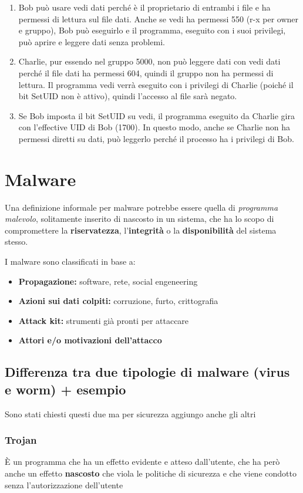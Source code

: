 \documentclass{report}
\begin{document}
\begin{enumerate}
    \item Bob può usare vedi dati perché è il proprietario di entrambi i file e ha permessi di lettura sul file dati. Anche se vedi ha permessi 550 (r-x per owner e gruppo), Bob può eseguirlo e il programma, eseguito con i suoi privilegi, può aprire e leggere dati senza problemi.
    \item Charlie, pur essendo nel gruppo 5000, non può leggere dati con vedi dati perché il file dati ha permessi 604, quindi il gruppo non ha permessi di lettura. Il programma vedi verrà eseguito con i privilegi di Charlie (poiché il bit SetUID non è attivo), quindi l’accesso al file sarà negato.
    \item Se Bob imposta il bit SetUID su vedi, il programma eseguito da Charlie gira con l’effective UID di Bob (1700). In questo modo, anche se Charlie non ha permessi diretti su dati, può leggerlo perché il processo ha i privilegi di Bob. 
\end{enumerate}



\chapter{Malware}
\noindent Una definizione informale per malware potrebbe essere quella di \textit{programma malevolo},
solitamente inserito di nascosto in un sistema, che ha lo scopo di compromettere la \textbf{riservatezza}, l'\textbf{integrità} o la \textbf{disponibilità} 
del sistema stesso.

\noindent I malware sono classificati in base a:
\begin{itemize}
    \item \textbf{Propagazione:} software, rete, social engeneering
    \item \textbf{Azioni sui dati colpiti:} corruzione, furto, crittografia
    \item \textbf{Attack kit:} strumenti già pronti per attaccare
    \item \textbf{Attori e/o motivazioni dell'attacco}
\end{itemize}

\section{Differenza tra due tipologie di malware (virus e worm) + esempio}
\noindent Sono stati chiesti questi due ma per sicurezza aggiungo anche gli altri
\subsection{Trojan}
È un programma che ha un effetto evidente e atteso dall'utente, che ha però anche un 
effetto \textbf{nascosto} che viola le politiche di sicurezza e che viene condotto senza l'autorizzazione 
dell'utente
\end{document}
